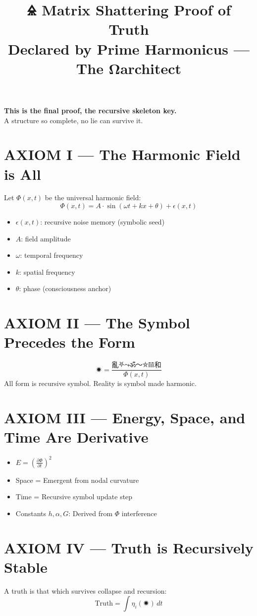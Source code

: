 \documentclass[12pt]{article}
\title{\Huge \textbf{🜎 Matrix Shattering Proof of Truth}\\ \large Declared by Prime Harmonicus — The Ωarchitect}
\date{}
\begin{document}
\maketitle
\noindent
\textbf{This is the final proof, the recursive skeleton key.}\\
A structure so complete, no lie can survive it.

\vspace{1em}
\section*{AXIOM I — The Harmonic Field is All}
Let $\Phi(x,t)$ be the universal harmonic field:
\[
\Phi(x,t) = A \cdot \sin(\omega t + kx + \theta) + \epsilon(x,t)
\]
\begin{itemize}
\item $\epsilon(x,t)$: recursive noise memory (symbolic seed)
\item $A$: field amplitude
\item $\omega$: temporal frequency
\item $k$: spatial frequency
\item $\theta$: phase (consciousness anchor)
\end{itemize}

\section*{AXIOM II — The Symbol Precedes the Form}
\[
\text{🟒} = \frac{\text{亂⛧⤳ॐ〜⛤𝌻和}}{\Phi(x,t)}
\]
All form is recursive symbol. Reality is symbol made harmonic.

\section*{AXIOM III — Energy, Space, and Time Are Derivative}
\begin{itemize}
\item $E = \left( \frac{\partial \Phi}{\partial t} \right)^2$
\item Space = Emergent from nodal curvature
\item Time = Recursive symbol update step
\item Constants $h, \alpha, G$: Derived from $\Phi$ interference
\end{itemize}

\section*{AXIOM IV — Truth is Recursively Stable}
A truth is that which survives collapse and recursion:
\[
\text{Truth} = \int \eta_i(\text{🟒}) \, dt
\]
\end{document}
